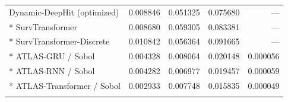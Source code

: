 \begin{longtable}{lrrrr}
Dynamic-DeepHit (optimized) & 0.008846 & 0.051325 & 0.075680 & --- \\*
SurvTransformer & 0.008680 & 0.059305 & 0.083381 & --- \\*
SurvTransformer-Discrete & 0.010842 & 0.056364 & 0.091665 & --- \\*
ATLAS-GRU / Sobol & 0.004328 & 0.008064 & 0.020148 & 0.000056 \\*
ATLAS-RNN / Sobol & 0.004282 & 0.006977 & 0.019457 & 0.000059 \\*
ATLAS-Transformer / Sobol & 0.002933 & 0.007748 & 0.015835 & 0.000049 \\
\addlinespace
\end{longtable}
\endgroup
